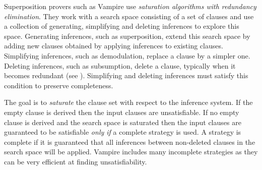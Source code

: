 \documentclass{llncs}
\begin{document}
Superposition provers such as Vampire use \emph{saturation algorithms with redundancy elimination}.
They work with a search space consisting of a set of clauses and use a collection of generating,
simplifying and deleting inferences to explore this space. 
Generating inferences, such as superposition, extend this search space by adding new clauses obtained by applying inferences to existing clauses.
Simplifying inferences, such as demodulation, replace a clause by a simpler one.
Deleting inferences, such as subsumption, delete a clause, typically when it becomes redundant (see \cite{resolutionHandbook}). Simplifying and deleting inferences must satisfy this condition to preserve completeness.

The goal is to \emph{saturate} the clause set with respect to the inference system. If the empty clause is derived then the input clauses are unsatisfiable. If no empty clause is derived and the search space is saturated then the input clauses are guaranteed to be satisfiable \emph{only if} a complete strategy is used. A strategy is complete if it is guaranteed that all inferences between non-deleted clauses in the search space will be applied. Vampire includes many incomplete strategies as they can be very efficient at finding unsatisfiability.

\end{document}

